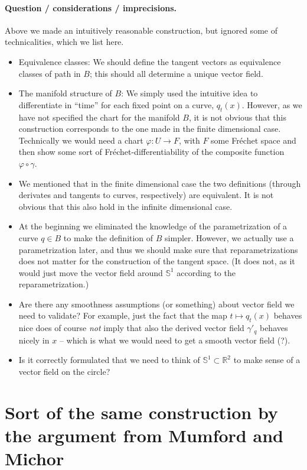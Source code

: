 \message{ !name(tangent_space_of_curves.tex)}\documentclass[a4,danish]{article}
\theoremstyle{break}
\theoremstyle{definition}
\theoremstyle{Break}
\newcommand{\R}{\mathbb{R}}
\renewcommand{\S}{\mathbb{S}}
\renewcommand{\phi}{\varphi}
\begin{document}
\paragraph{Question / considerations / imprecisions.}
Above we made an intuitively reasonable construction, but ignored some
of technicalities, which we list here.
\begin{itemize}
\item Equivalence classes: We should define the tangent vectors as
  equivalence classes of path in $B$; this should all determine a
  unique vector field.
\item The manifold structure of $B$: We simply used the intuitive idea
  to differentiate in ``time'' for each fixed point on a curve,
  $q_t(x)$. However, as we have not specified the chart for the
  manifold $B$, it is not obvious that this construction corresponds
  to the one made in the finite dimensional case. Technically we
  would need a chart $\phi \colon U \rightarrow F$, with $F$ some
  Fr\'echet space and then show some sort of Fr\'echet-differentiability of the
  composite function $\phi \circ \gamma$.
\item We mentioned that in the finite dimensional case the two
  definitions (through derivates and tangents to curves, respectively)
  are equivalent. It is not obvious that this also hold in the
  infinite dimensional case.
\item At the beginning we eliminated the knowledge of the
  parametrization of a curve $q \in B$ to make the definition of $B$
  simpler. However, we actually use a parametrization later, and thus
  we should make sure that reparametrizations does not matter for the
  construction of the tangent space. (It does not, as it would just
  move the vector field around $\S^1$ according to the
  reparametrization.)
\item Are there any smoothness assumptions (or something) about vector
  field we need to validate? For example, just the fact that the map
  $t \mapsto q_t(x)$ behaves nice does of course \textit{not} imply
  that also the derived vector field $\gamma'_q$ behaves nicely in
  $x$ -- which is what we would need to get a smooth vector field
  (?).
\item Is it correctly formulated that we need to think of $\S^1
  \subset \R^2$ to make sense of a vector field on the circle?
\end{itemize}

\section{Sort of the same construction by the argument from Mumford and Michor}
\label{sec:defin-metr-tang}
\end{document}
